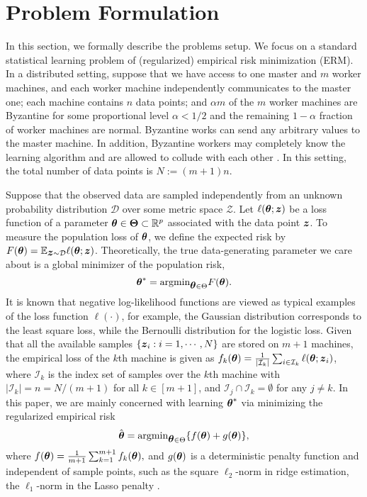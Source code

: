 \documentclass[12pt,a4paper]{article}%
\newcommand{\be}{\begin{equation}}
\newcommand{\ee}{\end{equation}}
\newcommand \vc[1]{{\mbox{\boldmath${#1}$}}}
\newcommand \vtheta{\vc \theta}
\newcommand \vZ{\vc z}
\numberwithin{equation}{section}
\begin{document}
\section{Problem Formulation}\label{ProbForm}
In this section, we formally describe the problems setup. We focus on a standard statistical learning problem of (regularized) empirical risk minimization (ERM). In a distributed setting, suppose that we have access to one master and $m$ worker machines, and each worker machine independently communicates to the master one; each machine contains $n$ data points; and $\alpha m$ of the $m$ worker machines are Byzantine for some proportional level $\alpha<1/2$ and the remaining $1-\alpha$ fraction of worker machines are normal. Byzantine works can send any arbitrary values to the master machine. In addition, Byzantine workers may completely know the learning algorithm and are allowed to collude with each other \citep{YinChenRB2018}. In this setting, the total number of  data points is $N:=(m+1)n$.

Suppose that the observed data are sampled independently from an unknown probability distribution $\mathcal{D}$ over some metric space $\mathcal{Z}$. Let $\ell(\vtheta;\vZ)$ be a loss function of a parameter $\vtheta\in \vc\Theta\subset \mathbb{R}^p$ associated with the data point $\vZ$.  To measure the population loss of $\vtheta$, we define the expected risk by $F(\vtheta)=\mathbb{E}_{\vZ\sim \mathcal{D}}\ell(\vtheta;\vZ)$. Theoretically,
the true data-generating parameter we care about is a global minimizer of the population risk,
$$\vtheta^*=\mathrm{argmin}_{\vtheta\in \Theta}F(\vtheta).$$
 It is known that  negative log-likelihood functions are viewed as typical examples of the loss function $\ell(\cdot)$, for example, the Gaussian distribution corresponds to the least square loss, while the Bernoulli distribution for the logistic loss. Given that all the available samples $\{\vZ_i: i=1,\cdots,N\}$ are  stored on $m+1$ machines, the empirical loss of the $k$th machine is given as $f_k(\vtheta)=\frac{1}{|\mathcal{I}_k|}\sum_{i\in \mathcal{I}_k}\ell(\vtheta;\vZ_i)$, where $\mathcal{I}_k$ is the index set of samples over the $k$th machine with $|\mathcal{I}_k|=n=N/(m+1)$ for all $k\in[m+1]$, and $\mathcal{I}_j\cap \mathcal{I}_k=\emptyset$ for any $j\neq k$. In this paper, we are mainly concerned with learning $\vtheta^*$ via  minimizing the regularized empirical risk
\be\label{eq2-1}
\hat{\vtheta}=\mathrm{argmin}_{\vtheta\in \Theta}\{f(\vtheta)+g(\vtheta)\},
\ee
where
$f(\vtheta)=\frac{1}{m+1}\sum_{k=1}^{m+1}f_k(\vtheta),$
and $g(\vtheta)$ is a deterministic penalty function and independent of sample points,  such as the square $\ell_2$-norm in ridge estimation, the $\ell_1$-norm in the Lasso penalty \citep{Tibshirani1996}.
\end{document}
